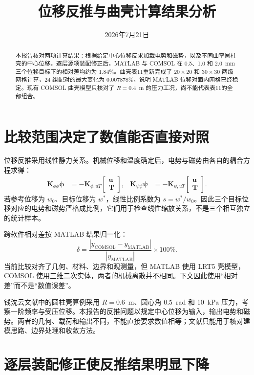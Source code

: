 \documentclass[UTF8,fontset=windows,11pt,a4paper]{ctexart}
\title{位移反推与曲壳计算结果分析}
\author{}
\date{2026年7月21日}
\begin{document}
\maketitle

\begin{abstract}
本报告核对两项计算结果：根据给定中心位移反求加载电势和磁势，以及不同曲率圆柱壳的中心位移。逐层源项装配修正后，MATLAB 与 COMSOL 在 0.5、1.0 和 2.0~mm 三个位移目标下的相对差均约为 1.84\%。曲壳表11重新完成了 $20\times20$ 和 $30\times30$ 两级网格计算，24 组配对的最大变化为 0.007878\%，说明 MATLAB 位移对面内网格已经稳定。现有 COMSOL 曲壳模型只核对了 $R=0.4$~m 的压力工况，尚不能代表表11的全部组合。
\end{abstract}

\section{比较范围决定了数值能否直接对照}

位移反推采用线性静力关系。机械位移和温度确定后，电势与磁势由各自的耦合方程求得：
\begin{align}
  \bm K_{\phi\phi}\bm\phi
  &=-\bm K_{\phi,uT}
  \begin{bmatrix}\bm u\\\bm T\end{bmatrix},
  &
  \bm K_{\psi\psi}\bm\psi
  &=-\bm K_{\psi,uT}
  \begin{bmatrix}\bm u\\\bm T\end{bmatrix}.
\end{align}
若参考位移为 $w_0$、目标位移为 $w^*$，线性比例系数为 $s=w^*/w_0$。因此三个目标位移对应的电势和磁势严格成比例，它们用于检查线性缩放关系，不是三个相互独立的统计样本。

跨软件相对差按 MATLAB 结果归一化：
\begin{equation}
  \delta=\frac{|y_{\mathrm{COMSOL}}-y_{\mathrm{MATLAB}}|}
  {|y_{\mathrm{MATLAB}}|}\times100\%.
\end{equation}
当前比较对齐了几何、材料、边界和观测量，但 MATLAB 使用 LRT5 壳模型，COMSOL 使用三维二次实体，两者的机械离散并不相同。下文因此使用“相对差”而不是“数值误差”。

钱沈云文献中的圆柱壳算例采用 $R=0.6$~m、圆心角 $0.5$~rad 和 10~kPa 压力，考察一阶频率与受压位移。本报告的反推问题以规定中心位移为输入，输出电势和磁势。两者的几何、载荷和输出不同，不能直接要求数值相等；文献只能用于核对建模思路、边界处理和收敛方法。

\section{逐层装配修正使反推结果明显下降}
\end{document}
